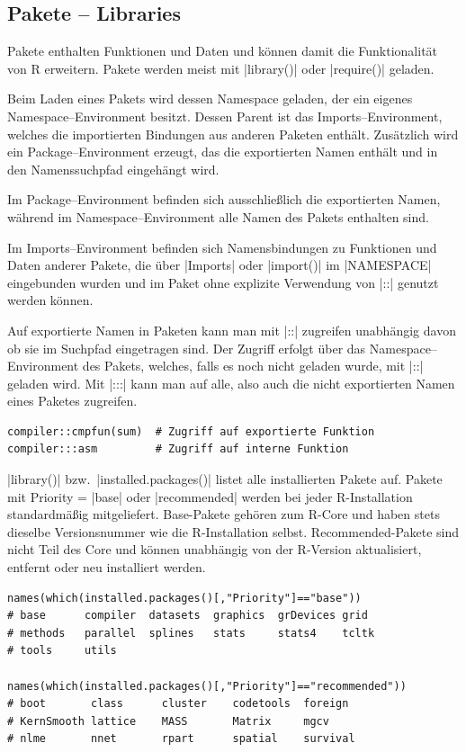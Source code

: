 \documentclass[10pt,twocolumn]{scrartcl}
\renewcommand{\lstinline}{\mycoloredinline}
\begin{document}
\subsection{Pakete -- Libraries}

Pakete enthalten Funktionen und Daten und können damit die Funktionalität von R erweitern. Pakete werden meist mit \lstinline|library()| oder \lstinline|require()| geladen.

Beim Laden eines Pakets wird dessen Namespace geladen, der ein eigenes
Namespace--Environment besitzt. Dessen Parent ist das Imports--Environment,
welches die importierten Bindungen aus anderen Paketen enthält. Zusätzlich
wird ein Package--Environment erzeugt, das die exportierten Namen enthält und
in den Namenssuchpfad eingehängt wird.

Im Package--Environment befinden sich ausschließlich die exportierten Namen,
während im Namespace--Environment alle Namen des Pakets enthalten sind.

Im Imports--Environment befinden sich Namensbindungen zu Funktionen und Daten
anderer Pakete, die über \lstinline|Imports| oder \lstinline|import()| im
\lstinline|NAMESPACE| eingebunden wurden und im Paket ohne explizite Verwendung
von \lstinline|::| genutzt werden können.

Auf exportierte Namen in Paketen kann man mit \lstinline|::| zugreifen unabhängig davon ob sie im Suchpfad eingetragen sind. Der Zugriff erfolgt über das Namespace--Environment des Pakets, welches, falls es noch nicht geladen wurde, mit \lstinline|::| geladen wird. Mit \lstinline|:::| kann man auf alle, also auch die nicht exportierten Namen eines Paketes zugreifen.

\begin{lstlisting}
compiler::cmpfun(sum)  # Zugriff auf exportierte Funktion 
compiler:::asm         # Zugriff auf interne Funktion 
\end{lstlisting}

\lstinline|library()| bzw.\ \lstinline|installed.packages()| listet alle installierten Pakete auf.
Pakete mit Priority = \lstinline|base| oder \lstinline|recommended| werden bei jeder R-Installation standardmäßig mitgeliefert.
Base-Pakete gehören zum R-Core und haben stets dieselbe Versionsnummer wie die R-Installation selbst.
Recommended-Pakete sind nicht Teil des Core und können unabhängig von der R-Version aktualisiert, entfernt oder neu installiert werden.

\begin{lstlisting}
names(which(installed.packages()[,"Priority"]=="base"))
# base      compiler  datasets  graphics  grDevices grid     
# methods   parallel  splines   stats     stats4    tcltk    
# tools     utils    

names(which(installed.packages()[,"Priority"]=="recommended"))
# boot       class      cluster    codetools  foreign   
# KernSmooth lattice    MASS       Matrix     mgcv      
# nlme       nnet       rpart      spatial    survival  
\end{lstlisting}
\end{document}

